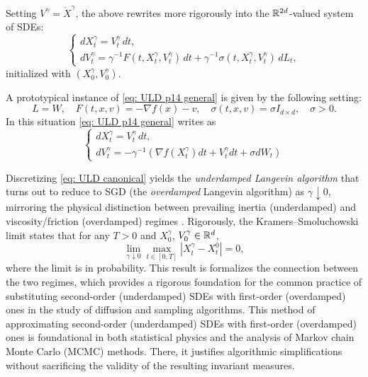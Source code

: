 \documentclass[12pt]{article}
\begin{document}
Setting $V^{\gamma} = \dot{X}^{\gamma}$, the above rewrites more rigorously into the ${\mathbb{R}}^{2d}$-valued system of SDEs:
\begin{equation}
\begin{cases}
dX_t^{\gamma} = V_t^{\gamma} \,dt, \\
dV_t^{\gamma} = \gamma^{-1} F(t, X_t^{\gamma}, V_t^{\gamma})\,dt + \gamma^{-1} \sigma(t, X_t^{\gamma}, V_t^{\gamma})\,dL_t,
\end{cases}
\label{eq: ULD p14 general}
\end{equation}
initialized with $(X_0^\gamma, V_0^\gamma)$.

A prototypical instance of \eqref{eq: ULD p14 general} is given by the following setting:
\begin{equation*}
\label{eq: - grad f - v}
L = W, \quad
F(t, x, v) = -\nabla f(x) - v, \quad
\sigma(t, x, v) = \sigma I_{d \times d},
\quad \sigma>0.
\end{equation*}
In this situation \eqref{eq: ULD p14 general} writes as
\begin{equation}
\label{eq: ULD canonical}
\boxed{
\begin{cases}
dX_t^{\gamma} = V_t^{\gamma} \,dt, \\
dV_t^{\gamma} = -\gamma^{-1} \left( \nabla f(X_t^{\gamma}) dt + V_t^{\gamma} dt + \sigma dW_t \right)
\end{cases}
}
\end{equation}

Discretizing \eqref{eq: ULD canonical} yields the \emph{underdamped Langevin algorithm} that turns out to  reduce to SGD (the \emph{overdamped} Langevin algorithm) as \(\gamma\downarrow 0\), mirroring the physical distinction between prevailing inertia (underdamped) and viscosity/friction (overdamped) regimes \cite{l08}.
Rigorously, the Kramers--Smoluchowski limit \cite{f04} states that for any $T>0$ and $X_0^\gamma$, $V_0^\gamma\in{\mathbb{R}}^d$,
\[
\lim_{\gamma\downarrow 0}\max_{t\in[0, T]}|X_t^{\gamma} - X_t^0|=0,
\]
where the limit is in probability.
This result is formalizes the connection between the two regimes, which provides a rigorous foundation for the common practice of substituting second-order (underdamped) SDEs with first-order (overdamped) ones in the study of diffusion and sampling algorithms.
This method of approximating second-order (underdamped) SDEs with first-order (overdamped) ones is foundational in both statistical physics and the analysis of Markov chain Monte Carlo (MCMC) methods.
There, it justifies algorithmic simplifications without sacrificing the validity of the resulting invariant measures.
\end{document}
